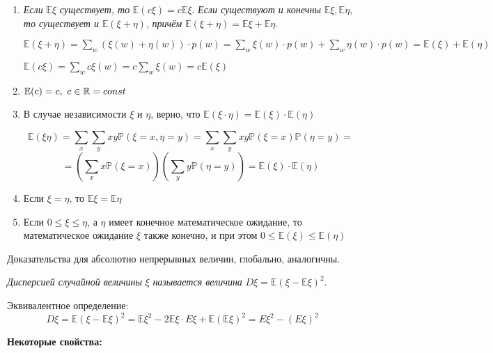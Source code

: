 \begin{enumerate}
  \item \textit{Если} $\mathbb{E}\xi$ \textit{существует, то} $\mathbb{E}(c\xi) = c\mathbb{E}\xi$. \textit{Если существуют и конечны} $\mathbb{E}\xi, \mathbb{E}\eta$, \textit{то существует и} $\mathbb{E}(\xi + \eta)$, \textit{причём} $\mathbb{E}(\xi + \eta) = \mathbb{E}\xi + \mathbb{E}\eta$.

  \Proof

    $\mathbb{E}(\xi + \eta) = \sum_{w} \left( \xi(w) + \eta(w) \right) \cdot p(w)
= \sum_{w} \xi(w) \cdot p(w) + \sum_{w} \eta(w) \cdot p(w)
= \mathbb{E}(\xi) + \mathbb{E}(\eta)$

  $\mathbb{E}(c \xi) = \sum_{w} c\xi(w) = c \sum_{w} \xi(w) = c \mathbb{E}(\xi)$  

  \Endproof

  \item $\mathbb{E} (c) = c, \ c \in \mathbb{R} = const$
  \item В случае независимости $\xi$ и $\eta$, верно, что $\mathbb{E} (\xi \cdot \eta) = \mathbb{E}(\xi) \cdot \mathbb{E}(\eta)$
  
  \Proof

  \[
\mathbb{E}(\xi \eta) = \sum_{x} \sum_{y} x y \mathbb{P}(\xi = x, \eta = y)
= \sum_{x} \sum_{y} x y \mathbb{P}(\xi = x) \mathbb{P}(\eta = y) =
  \]
  \[
    = \left( \sum_x x \mathbb{P}(\xi = x) \right) \left( \sum_y y \mathbb{P}(\eta = y) \right) = \mathbb{E}(\xi) \cdot \mathbb{E}(\eta)
  \]

  \Endproof

  \item Если $\xi = \eta$, то $\mathbb{E} \xi = \mathbb{E} \eta$
  \item Если $0 \leq \xi \leq \eta$, а $\eta$ имеет конечное математическое ожидание, то математическое ожидание $\xi$ также конечно, и при этом $0 \leq \mathbb{E}(\xi) \leq \mathbb{E}(\eta)$
\end{enumerate}

Доказательства для абсолютно непрерывных величин, глобально, аналогичны.

\Def \textit{Дисперсией случайной величины} $\xi$ \textit{называется величина} 
$
D\xi = \mathbb{E}(\xi - \mathbb{E}\xi)^2.
$

Эквивалентное определение:
\[
  D\xi = \mathbb{E}(\xi - \mathbb{E}\xi)^2 = \mathbb{E}\xi^2 - 2\mathbb{E}\xi \cdot E\xi + \mathbb{E}(\mathbb{E}\xi)^2 = E\xi^2 - (E\xi)^2
\]

\textbf{Некоторые свойства:}

